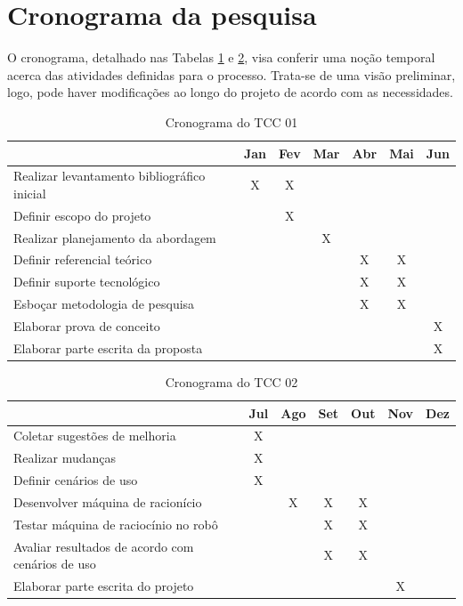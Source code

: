 \section{Cronograma da pesquisa}
O cronograma, detalhado nas Tabelas \ref{tab01} e \ref{tab02}, visa conferir uma noção temporal acerca das atividades definidas para o processo. Trata-se de uma visão preliminar, logo, pode haver modificações ao longo do projeto de acordo com as necessidades.      

\FloatBarrier
\begin{table}[h]
	\centering
	
	\begin{tabular}{lcccccc}
		\toprule
		& \textbf{Jan} & \textbf{Fev} & \textbf{Mar} & \textbf{Abr} & \textbf{Mai} & 		
		\textbf{Jun} \\
		\midrule
		Realizar levantamento bibliográfico inicial & X & X &  &  &  &  \\
		\midrule
		Definir escopo do projeto &  & X &  &  &  &  \\
		\midrule
		Realizar planejamento da abordagem &  &  & X &  &  &  \\
		\midrule
		Definir referencial teórico &  &  &  & X & X &  \\
		\midrule
		Definir suporte tecnológico &  &  &  & X & X &  \\
		\midrule
		Esboçar metodologia de pesquisa &  &  &  & X & X &  \\
		\midrule
		Elaborar prova de conceito &  &  &  &  &  & X \\
		\midrule
		Elaborar parte escrita da proposta &  &  &  &  &  & X \\
		\bottomrule
	\end{tabular}

	\caption{Cronograma do TCC 01}
	\label{tab01}
\end{table}

\FloatBarrier
\begin{table}[h]
	\centering
	
	\begin{tabular}{lcccccc}
		\toprule
		& \textbf{Jul} & \textbf{Ago} & \textbf{Set} & \textbf{Out} & \textbf{Nov} & 		
		\textbf{Dez} \\
		\midrule
		Coletar sugestões de melhoria & X &  &  &  &  &  \\
		\midrule
		Realizar mudanças & X &  &  &  &  &  \\
		\midrule
		Definir cenários de uso & X &  &  &  &  &  \\
		\midrule
		Desenvolver máquina de racionício &  & X & X & X &  &  \\
		\midrule
		Testar máquina de raciocínio no robô &  &  & X & X &  &  \\
		\midrule
		Avaliar resultados de acordo com cenários de uso &  &  & X & X &  &  \\
		\midrule
		Elaborar parte escrita do projeto &  &  &  &  & X &  \\
		\bottomrule
	\end{tabular}

	\caption{Cronograma do TCC 02}
	\label{tab02}
\end{table}

